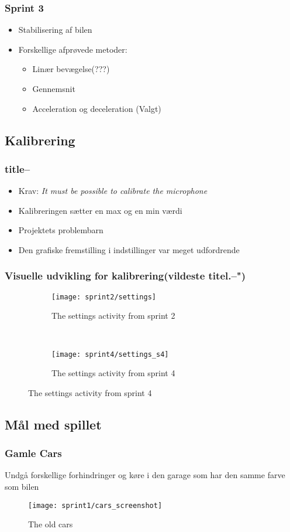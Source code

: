 \begin{frame}
\frametitle{Sprint 3}
\begin{itemize}
\item Stabilisering af bilen
\item Forskellige afprøvede metoder:
\begin{itemize}
\item Linær bevægelse(???)
\item Gennemsnit
\item Acceleration og deceleration (Valgt)
\end{itemize}
\end{itemize}
\end{frame}


\subsection{Kalibrering}
\begin{frame}
\frametitle{title--}
\begin{itemize}
\item Krav: \textit{It must be possible to calibrate the microphone}
\item Kalibreringen sætter en max og en min værdi
\item Projektets problembarn
\item Den grafiske fremstilling i indstillinger var meget udfordrende
\end{itemize}
\end{frame}

\begin{frame}
\frametitle{Visuelle udvikling for kalibrering(vildeste titel.--")}
\begin{figure}
\begin{subfigure}[b]{0.4\textwidth}
\texttt{[image: sprint2/settings]}
\caption{The settings activity from sprint 2}
\end{subfigure}
~
\begin{subfigure}[b]{0.4\textwidth}
\texttt{[image: sprint4/settings\_s4]}
\caption{The settings activity from sprint 4}
\end{subfigure}
\end{figure}
\end{frame}

\subsection{Mål med spillet}
\begin{frame}
\frametitle{Gamle Cars}
Undgå forskellige forhindringer og køre i den garage som har den samme farve som bilen
\begin{figure}
\texttt{[image: sprint1/cars\_screenshot]}
\caption{The old cars}
\end{figure}
\end{frame}

